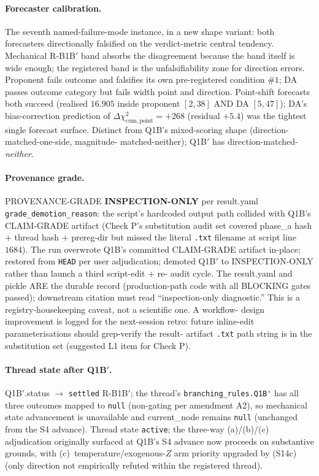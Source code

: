 \documentclass[11pt]{article}
\theoremstyle{definition}
\theoremstyle{plain}
\begin{document}
\paragraph{Forecaster calibration.}
The seventh named-failure-mode instance, in a new shape variant:
both forecasters directionally falsified on the verdict-metric
central tendency. Mechanical R-B1B$'$ band absorbs the disagreement
because the band itself is wide enough; the registered band is
the unfalsifiability zone for direction errors. Proponent fails
outcome and falsifies its own pre-registered condition $\#1$; DA
passes outcome category but fails width point and direction.
Point-shift forecasts both succeed (realised $16.905$ inside
proponent $[2, 38]$ AND DA $[5, 47]$); DA's bias-correction
prediction of $\Delta\chi^2_{\mathrm{cum,point}} = +268$ (residual
$+5.4$) was the tightest single forecast surface. Distinct from
Q1B's mixed-scoring shape (direction-matched-one-side, magnitude-
matched-neither); Q1B$'$ has direction-matched-\emph{neither}.

\paragraph{Provenance grade.}
PROVENANCE-GRADE \textbf{INSPECTION-ONLY} per result.yaml
\verb|grade_demotion_reason|: the script's hardcoded
 output path
collided with Q1B's CLAIM-GRADE artifact (Check P's substitution
audit set covered phase\_a hash + thread hash + prereg-dir but
missed the literal \texttt{.txt} filename at script line $1684$).
The run overwrote Q1B's committed CLAIM-GRADE artifact in-place;
restored from \texttt{HEAD} per user adjudication; demoted Q1B$'$
to INSPECTION-ONLY rather than launch a third script-edit + re-
audit cycle. The result.yaml and pickle ARE the durable record
(production-path code with all BLOCKING gates passed); downstream
citation must read ``inspection-only diagnostic.'' This is a
registry-housekeeping caveat, not a scientific one. A workflow-
design improvement is logged for the next-session retro: future
inline-edit parameterisations should grep-verify the result-
artifact \texttt{.txt} path string is in the substitution set
(suggested L1 item for Check P).

\paragraph{Thread state after Q1B$'$.}
Q1B$'$.status $\to$ \texttt{settled} R-B1B$'$; the thread's
\verb|branching_rules.Q1B'| has all three outcomes mapped to
\texttt{null} (non-gating per amendment A2), so mechanical state
advancement is unavailable and current\_node remains \texttt{null}
(unchanged from the S4 advance). Thread state \texttt{active};
the three-way (a)/(b)/(c) adjudication originally surfaced at
Q1B's S4 advance now proceeds on substantive grounds, with
(c)~temperature/exogenous-$Z$ arm priority upgraded by (S14c)
(only direction not empirically refuted within the registered
thread).
\end{document}
